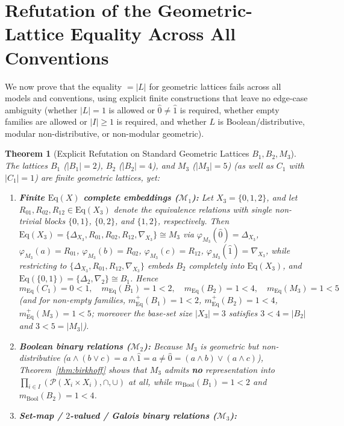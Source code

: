 \documentclass[11pt]{article}
\newtheorem{theorem}{Theorem}[section]
\theoremstyle{definition}
\theoremstyle{remark}
\newcommand{\Eq}{\mathrm{Eq}}
\newcommand{\Pow}{\mathcal{P}}
\begin{document}
\section{Refutation of the Geometric-Lattice Equality Across All Conventions}
\label{sec:refutation}

We now prove that the equality $= |L|$ for geometric lattices fails across all models and conventions, using explicit finite constructions that leave no edge-case ambiguity (whether $|L|=1$ is allowed or $\hat{0} \neq \hat{1}$ is required, whether empty families are allowed or $|I| \ge 1$ is required, and whether $L$ is Boolean/distributive, modular non-distributive, or non-modular geometric).

\begin{theorem}[Explicit Refutation on Standard Geometric Lattices $B_1, B_2, M_3$]
\label{thm:counterexamples}
The lattices $B_1$ ($|B_1|=2$), $B_2$ ($|B_2|=4$), and $M_3$ ($|M_3|=5$) (as well as $C_1$ with $|C_1|=1$) are finite geometric lattices, yet:
\begin{enumerate}
\item[(1)] \textbf{Finite $\Eq(X)$ complete embeddings ($\mathcal{M}_1$):} Let $X_3 = \{0,1,2\}$, and let $R_{01}, R_{02}, R_{12} \in \Eq(X_3)$ denote the equivalence relations with single non-trivial blocks $\{0,1\}$, $\{0,2\}$, and $\{1,2\}$, respectively. Then $\Eq(X_3) = \{\Delta_{X_3}, R_{01}, R_{02}, R_{12}, \nabla_{X_3}\} \cong M_3$ via $\varphi_{M_3}(\hat{0})=\Delta_{X_3}$, $\varphi_{M_3}(a)=R_{01}$, $\varphi_{M_3}(b)=R_{02}$, $\varphi_{M_3}(c)=R_{12}$, $\varphi_{M_3}(\hat{1})=\nabla_{X_3}$, while restricting to $\{\Delta_{X_3}, R_{01}, R_{12}, \nabla_{X_3}\}$ embeds $B_2$ completely into $\Eq(X_3)$, and $\Eq(\{0,1\}) = \{\Delta_2, \nabla_2\} \cong B_1$. Hence
\[
  m_{\Eq}(C_1) = 0 < 1, \quad
  m_{\Eq}(B_1) = 1 < 2, \quad
  m_{\Eq}(B_2) = 1 < 4, \quad
  m_{\Eq}(M_3) = 1 < 5
\]
(and for non-empty families, $m_{\Eq}^+(B_1)=1<2$, $m_{\Eq}^+(B_2)=1<4$, $m_{\Eq}^+(M_3)=1<5$; moreover the base-set size $|X_3|=3$ satisfies $3 < 4 = |B_2|$ and $3 < 5 = |M_3|$).
\item[(2)] \textbf{Boolean binary relations ($\mathcal{M}_2$):} Because $M_3$ is geometric but non-distributive ($a \wedge (b \vee c) = a \wedge \hat{1} = a \neq \hat{0} = (a \wedge b) \vee (a \wedge c)$), Theorem~\ref{thm:birkhoff} shows that $M_3$ admits \textbf{no} representation into $\prod_{i \in I} (\Pow(X_i \times X_i), \cap, \cup)$ at all, while $m_{\mathrm{Bool}}(B_1) = 1 < 2$ and $m_{\mathrm{Bool}}(B_2) = 1 < 4$.
\item[(3)] \textbf{Set-map / $2$-valued / Galois binary relations ($\mathcal{M}_3$):}

\end{enumerate}
\end{theorem}
\end{document}
